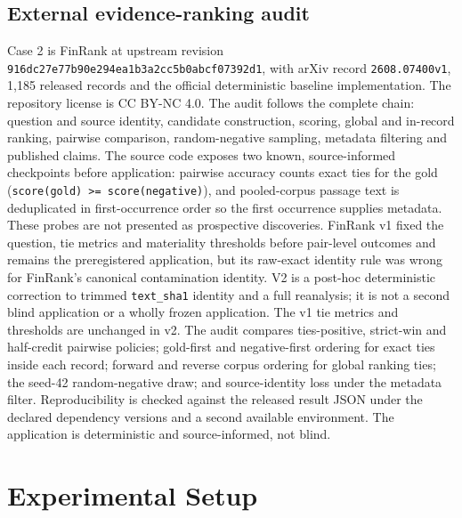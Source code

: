 \documentclass[10pt,conference]{IEEEtran}
\begin{document}
\subsection{External evidence-ranking audit}
Case 2 is FinRank at upstream revision \texttt{916dc27e77b90e294ea1b3a2cc5b0abcf07392d1}, with arXiv record \texttt{2608.07400v1}, 1,185 released records and the official deterministic baseline implementation. The repository license is CC BY-NC 4.0. The audit follows the complete chain: question and source identity, candidate construction, scoring, global and in-record ranking, pairwise comparison, random-negative sampling, metadata filtering and published claims.
The source code exposes two known, source-informed checkpoints before application: pairwise accuracy counts exact ties for the gold (\texttt{score(gold) >= score(negative)}), and pooled-corpus passage text is deduplicated in first-occurrence order so the first occurrence supplies metadata. These probes are not presented as prospective discoveries. FinRank v1 fixed the question, tie metrics and materiality thresholds before pair-level outcomes and remains the preregistered application, but its raw-exact identity rule was wrong for FinRank's canonical contamination identity. V2 is a post-hoc deterministic correction to trimmed \texttt{text\_sha1} identity and a full reanalysis; it is not a second blind application or a wholly frozen application. The v1 tie metrics and thresholds are unchanged in v2.
The audit compares ties-positive, strict-win and half-credit pairwise policies; gold-first and negative-first ordering for exact ties inside each record; forward and reverse corpus ordering for global ranking ties; the seed-42 random-negative draw; and source-identity loss under the metadata filter. Reproducibility is checked against the released result JSON under the declared dependency versions and a second available environment. The application is deterministic and source-informed, not blind.
\section{Experimental Setup}
\end{document}
